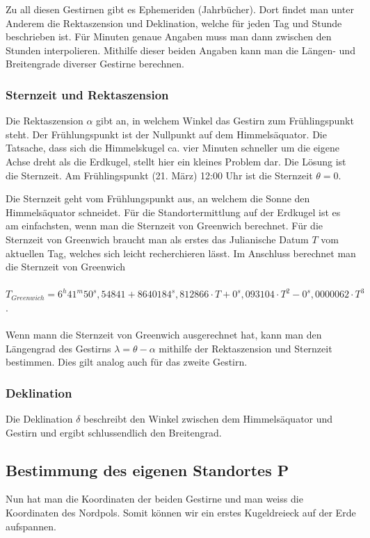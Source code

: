 Zu all diesen Gestirnen gibt es Ephemeriden (Jahrbücher). 
Dort findet man unter Anderem die Rektaszension und  Deklination, welche für jeden Tag und Stunde beschrieben ist. Für Minuten genaue Angaben muss man dann zwischen den Stunden interpolieren.
Mithilfe dieser beiden Angaben kann man die Längen- und Breitengrade diverser Gestirne berechnen.

\subsubsection{Sternzeit und Rektaszension}
Die Rektaszension $\alpha$ gibt an, in welchem Winkel das Gestirn zum Frühlingspunkt steht. 
Der Frühlungspunkt ist der Nullpunkt auf dem Himmelsäquator. 
Die Tatsache, dass sich die Himmelskugel  ca. vier Minuten schneller um die eigene Achse dreht als die Erdkugel, stellt hier ein kleines Problem dar.
Die Lösung ist die Sternzeit. 
Am Frühlingspunkt (21. März) 12:00 Uhr ist die Sternzeit
$\theta = 0$. 

Die Sternzeit geht vom Frühlungspunkt aus, an welchem die Sonne den Himmelsäquator schneidet.
Für die Standortermittlung auf der Erdkugel ist es am einfachsten, wenn man die Sternzeit von Greenwich berechnet. 
Für die Sternzeit von Greenwich braucht man als erstes das Julianische Datum $T$ vom aktuellen Tag, welches sich leicht recherchieren lässt.
Im Anschluss berechnet man die Sternzeit von Greenwich
\\
\\
$T_{Greenwich} = 6^h 41^m 50^s,54841 + 8640184^s,812866 \cdot T + 0^s,093104 \cdot T^2 - 0^s,0000062 \cdot T^3$.
\\
\\
Wenn mann die Sternzeit von Greenwich ausgerechnet hat, kann man den Längengrad des Gestirns $\lambda = \theta - \alpha$ mithilfe der Rektaszension und Sternzeit bestimmen. 
Dies gilt analog auch für das zweite Gestirn.

\subsubsection{Deklination}
Die Deklination $\delta$ beschreibt den Winkel zwischen dem Himmelsäquator und Gestirn und ergibt schlussendlich den Breitengrad.


\newpage
\subsection{Bestimmung des eigenen Standortes P}
Nun hat man die Koordinaten der beiden Gestirne und man weiss die Koordinaten des Nordpols.
Somit können wir ein erstes Kugeldreieck auf der Erde aufspannen.


